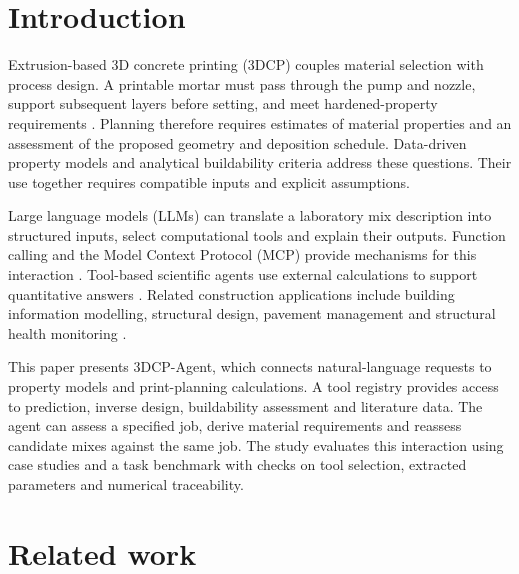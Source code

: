 \documentclass[preprint,12pt]{elsarticle}
\begin{document}
\linenumbers

\section{Introduction}

Extrusion-based 3D concrete printing (3DCP) couples material selection with process design. A printable mortar must pass through the pump and nozzle, support subsequent layers before setting, and meet hardened-property requirements \cite{buswell2018roadmap,roussel2018rheological}. Planning therefore requires estimates of material properties and an assessment of the proposed geometry and deposition schedule. Data-driven property models \cite{malik2024mixdesign3dcp,zafar2025ensemblerheology,ali2023mltensile3dcp,monkman2026datadrivenreview} and analytical buildability criteria \cite{roussel2018rheological,perrot2016structural,suiker2018mechanical,wolfs2018early,kruger2019lowerbound} address these questions. Their use together requires compatible inputs and explicit assumptions.

Large language models (LLMs) can translate a laboratory mix description into structured inputs, select computational tools and explain their outputs. Function calling and the Model Context Protocol (MCP) provide mechanisms for this interaction \cite{schick2023toolformer,yao2023react,anthropic2024mcp,hou2025mcp}. Tool-based scientific agents use external calculations to support quantitative answers \cite{bran2024chemcrow}. Related construction applications include building information modelling, structural design, pavement management and structural health monitoring \cite{du2026text2bim,dong2025aibim,chen2025multiagentrc,zeng2026pavementagents,liu2026llm4shm,avila2025hai}.

This paper presents 3DCP-Agent, which connects natural-language requests to property models and print-planning calculations. A tool registry provides access to prediction, inverse design, buildability assessment and literature data. The agent can assess a specified job, derive material requirements and reassess candidate mixes against the same job. The study evaluates this interaction using case studies and a task benchmark with checks on tool selection, extracted parameters and numerical traceability.

\section{Related work}\label{sec:related}
\end{document}
